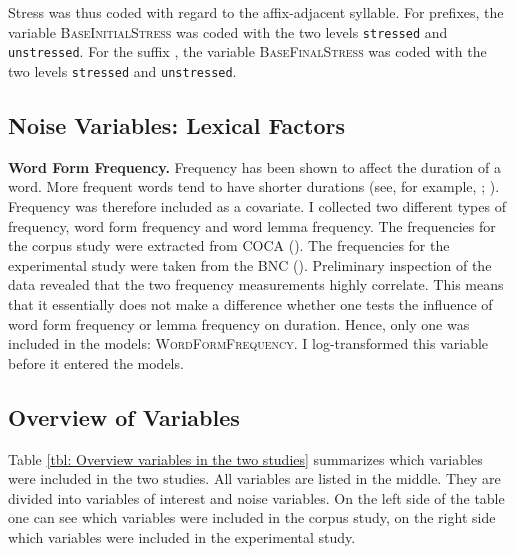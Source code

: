 Stress was thus coded with regard to the affix-adjacent syllable. For prefixes, the variable \textsc{BaseInitialStress} was coded with the two levels \texttt{stressed} and \texttt{unstressed}. For the suffix , the variable \textsc{BaseFinalStress} was coded with the two levels \texttt{stressed} and \texttt{unstressed}.



\subsection{Noise Variables: Lexical Factors}


\textbf{Word Form Frequency.}					
Frequency has been shown to affect the duration of a word. More frequent words tend to have shorter durations (see, for example, \citealt{Aylett.2004}; \citealt{Gahl.2008}). Frequency was therefore included as a covariate. I collected two different types of frequency, word form frequency and word lemma frequency. 
The frequencies for the corpus study were extracted from COCA (\citealt{Davies.20082014}). The frequencies for the experimental study were taken from the BNC (\citealt{Davies.2004}).
Preliminary inspection of the data revealed that the two frequency measurements highly correlate. This means that it essentially does not make a difference whether one tests the influence of word form frequency or lemma frequency on duration. Hence, only one was included in the models: \textsc{WordFormFrequency}. I log-transformed this variable before it entered the models.

\subsection{Overview of Variables}
		
Table \ref{tbl: Overview variables in the two studies} summarizes which variables were included in the two studies. All variables are listed in the middle. They are divided into variables of interest and noise variables. On the left side of the table one can see which variables were included in the corpus study, on the right side which variables were included in the experimental study.  



